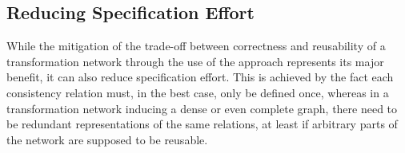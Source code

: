 


\subsection{Reducing Specification Effort}
\label{chap:improvement:benefits:specification_effort}

While the mitigation of the trade-off between correctness and reusability of a transformation network through the use of the \commonalities approach represents its major benefit, it can also reduce specification effort.
This is achieved by the fact each consistency relation must, in the best case, only be defined once, whereas in a transformation network inducing a dense or even complete graph, there need to be redundant representations of the same relations, at least if arbitrary parts of the network are supposed to be reusable.

